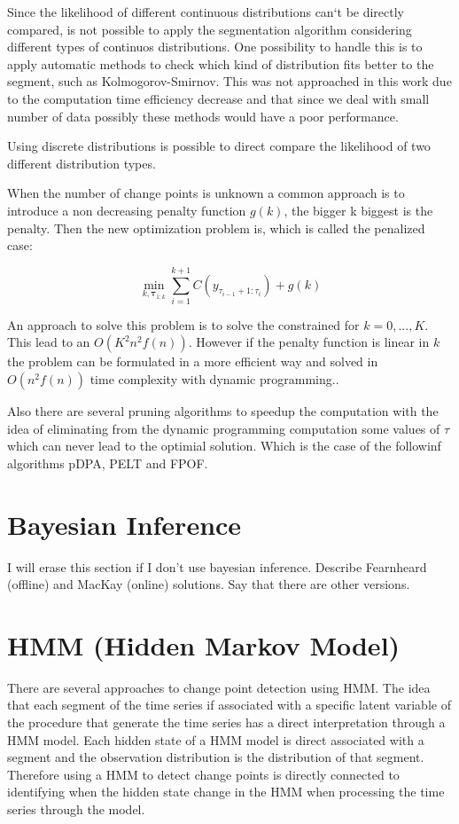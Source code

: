 Since the likelihood of different continuous distributions can`t be directly compared, is not possible to apply the segmentation algorithm considering different types of continuos distributions. One possibility to handle this is to apply automatic methods to check which kind of distribution fits better to the segment, such as Kolmogorov-Smirnov. This was not approached in this work due to the computation time efficiency decrease and that since we deal with small number of data possibly these methods would have a poor performance.

Using discrete distributions is possible to direct compare the likelihood of two different distribution types. 

When the number of change points is unknown a common approach is to introduce a non decreasing penalty function $g(k)$, the bigger k biggest is the penalty. Then the new optimization problem is, which is called the penalized case:

\begin{equation}
    \min_{k, \boldsymbol \tau_{1 : k}} \sum \limits_{i = 1}^{k + 1} C(y_{\tau_{i - 1} + 1 : \tau_{i}}) + g(k)
\end{equation}

An approach to solve this problem is to solve the constrained for $k = 0, ..., K$. This lead to an $O(K^{2} n^{2} f(n))$. However if the penalty function is linear in $k$ the problem can be formulated in a more efficient way and solved in $O(n^{2} f(n))$ time complexity with dynamic programming..

Also there are several pruning algorithms to speedup the computation with the idea of eliminating from the dynamic programming computation some values of $\tau$ which can never lead to the optimial solution. Which is the case of the followinf algorithms pDPA, PELT and FPOF.

\section{Bayesian Inference}
I will erase this section if I don't use bayesian inference. Describe Fearnheard (offline) and MacKay (online) solutions. Say that there are other versions.

\section{HMM (Hidden Markov Model)}

There are several approaches to change point detection using HMM. The idea that each segment of the time series if associated with a specific latent variable of the procedure that generate the time series has a direct interpretation through a HMM model. Each hidden state of a HMM model is direct associated with a segment and the observation distribution is the distribution of that segment. Therefore using a HMM to detect change points is directly connected to identifying when the hidden state change in the HMM when processing the time series through the model.

